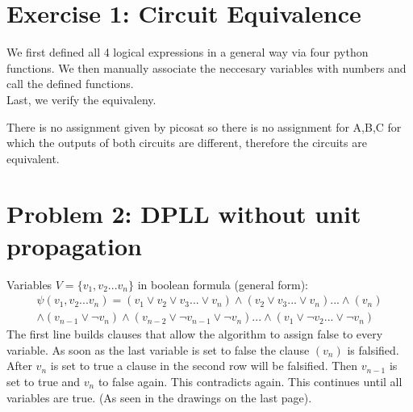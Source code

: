 \documentclass{../base/base}
\begin{document}



\section*{Exercise 1: Circuit Equivalence}


We first defined all 4 logical expressions in a general way via four python functions. We then manually associate the neccesary variables with numbers and call the defined functions. \\
Last, we verify the equivaleny.







There is no assignment given by picosat so there is no assignment for A,B,C for which the outputs of both circuits are different, therefore the circuits are equivalent.

\section*{Problem 2:  DPLL without unit propagation}
Variables $V = \{v_1,v_2...v_n\}$ in boolean formula (general form):
\begin{multline*}
    \psi(v_1,v_2...v_n) = (v_1\lor v_2\lor v_3...\lor v_n)\land (v_2\lor v_3...\lor v_n)...\land (v_n) \\
    \land(v_{n-1} \lor \neg v_n) \land (v_{n-2}\lor \neg v_{n-1}\lor \neg v_n)...	\land (v_1\lor \neg v_2...\lor \neg v_n)
\end{multline*}
The first line builds clauses that allow the algorithm to assign false to every variable.
As soon as the last variable is set to false the clause $(v_n)$ is falsified.
After $v_n$ is set to true a clause in the second row will be falsified.
Then $v_{n-1}$ is set to true and $v_n$ to false again. This contradicts again. This continues until all variables are true. (As seen in the drawings on the last page).
\end{document}
